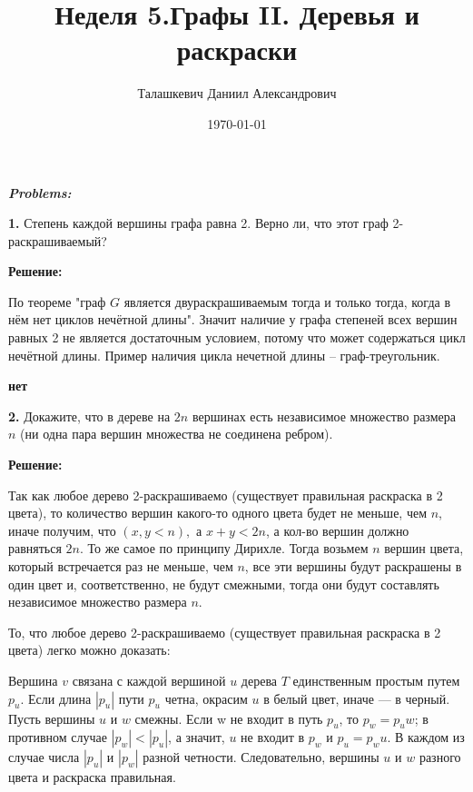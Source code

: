 \documentclass[a4paper,12pt]{article} %
\author{Талашкевич Даниил Александрович}
\title{Неделя 5.Графы II. Деревья и раскраски}
\date{\today}
\begin{document}
\maketitle
\thispagestyle{empty}

\newpage
\setcounter{page}{1}
\begin{center}
\itshape
\bfseries
{ \Large Problems:}
\end{center}

{\bf 1.} Степень каждой вершины графа равна 2. Верно ли, что этот граф
2-раскрашиваемый?
\begin{center}
\bfseries
{\Large Решение: }
\end{center}

По теореме "граф $G$ является двураскрашиваемым тогда и только тогда, когда в
нём нет циклов нечётной длины". Значит наличие у графа степеней всех вершин равных 2 не является достаточным условием, потому что может содержаться цикл нечётной длины. Пример наличия цикла нечетной длины -- граф-треугольник.

\begin{flushright}
\begin{large}
\textbf {нет }
\end{large}
\end{flushright}

{\bf 2.} Докажите, что в дереве на $2n$ вершинах есть независимое множество
размера $n$ (ни одна пара вершин множества не соединена ребром). 
\begin{center}
\bfseries
{\Large Решение: }
\end{center}

Так как любое дерево 2-раскрашиваемо (существует правильная раскраска в 2 цвета), то количество вершин какого-то одного цвета будет не меньше, чем $n$, иначе получим, что $(x,y<n),$ а $ x+y < 2n$, а кол-во вершин должно равняться $2n$. То же самое по принципу Дирихле. Тогда возьмем $n$ вершин цвета, который встречается раз не меньше, чем $n$, все эти вершины будут раскрашены в один цвет и, соответственно, не будут смежными, тогда они будут составлять независимое множество размера $n$.

То, что любое дерево 2-раскрашиваемо (существует правильная раскраска в 2 цвета) легко можно доказать:

Вершина $v $ связана с каждой вершиной $u$ дерева $T$ единственным простым путем
$p_u$. Если длина $|p_u|$ пути $p_u$ четна, окрасим $u$ в белый цвет, иначе — в черный. Пусть
вершины $u$ и $w$ смежны. Если w не входит в путь $p_u$, то $p_w = p_uw$; в противном
случае $|p_w| < |p_u|$, а значит, $u$ не входит в $p_w$ и $p_u = p_wu$. В каждом из случае
числа $|p_u|$ и $|p_w|$ разной четности. Следовательно, вершины $ u$ и $w$ разного цвета и раскраска правильная.\\
\end{document}
